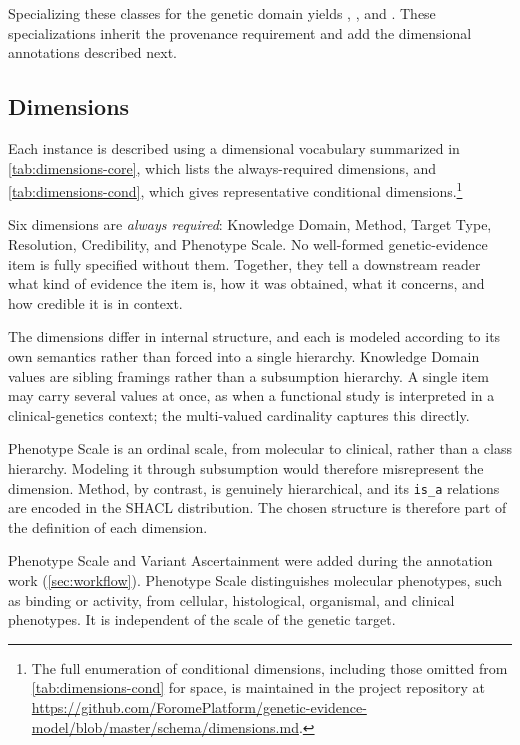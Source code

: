 Specializing these classes for the genetic domain yields
\GeneticEvidence, \GeneticEvidenceVariable, and
\GeneticEvidenceAssertion. These specializations inherit the provenance
requirement and add the dimensional annotations described next.

\subsection{Dimensions}
\label{sec:model-dimensions}

Each \GeneticEvidence{} instance is described using a dimensional
vocabulary summarized in \cref{tab:dimensions-core}, which lists the
always-required dimensions, and \cref{tab:dimensions-cond}, which gives
representative conditional dimensions.\footnote{The full enumeration of
conditional dimensions, including those omitted from
\cref{tab:dimensions-cond} for space, is maintained in the project
repository at
\url{https://github.com/ForomePlatform/genetic-evidence-model/blob/master/schema/dimensions.md}.}

Six dimensions are \emph{always required}: Knowledge Domain, Method,
Target Type, Resolution, Credibility, and Phenotype Scale. No
well-formed genetic-evidence item is fully specified without them.
Together, they tell a downstream reader what kind of evidence the item
is, how it was obtained, what it concerns, and how credible it is in
context.

The dimensions differ in internal structure, and each is modeled
according to its own semantics rather than forced into a single
hierarchy. Knowledge Domain values are sibling framings rather than a
subsumption hierarchy. A single item may carry several values at once,
as when a functional study is interpreted in a clinical-genetics
context; the multi-valued cardinality captures this directly.

Phenotype Scale is an ordinal scale, from molecular to clinical, rather
than a class hierarchy. Modeling it through subsumption would therefore
misrepresent the dimension. Method, by contrast, is genuinely
hierarchical, and its \texttt{is\_a} relations are encoded in the SHACL
distribution. The chosen structure is therefore part of the definition
of each dimension.

Phenotype Scale and Variant Ascertainment were added during the annotation
work (\cref{sec:workflow}). Phenotype Scale distinguishes molecular
phenotypes, such as binding or activity, from cellular, histological,
organismal, and clinical phenotypes. It is independent of the scale of the
genetic target.

